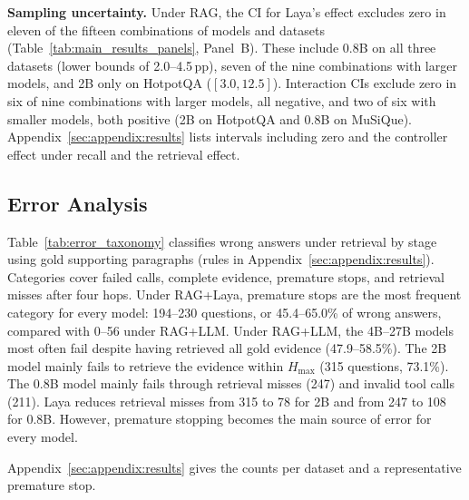 \textbf{Sampling uncertainty.} Under RAG, the CI for Laya's effect excludes zero in
eleven of the fifteen combinations of models and datasets
(Table~\ref{tab:main_results_panels}, Panel~B). These include 0.8B on all three
datasets (lower bounds of 2.0--4.5\,pp), seven of the nine combinations with larger
models, and 2B only on HotpotQA ($[3.0, 12.5]$). Interaction CIs exclude zero in six
of nine combinations with larger models, all negative, and two of six with smaller
models, both positive (2B on HotpotQA and 0.8B on MuSiQue).
Appendix~\ref{sec:appendix:results} lists intervals including zero and the controller
effect under recall and the retrieval effect.

\subsection{Error Analysis}
\label{sec:exp:errors}

Table~\ref{tab:error_taxonomy} classifies wrong answers under retrieval by stage using
gold supporting paragraphs (rules in Appendix~\ref{sec:appendix:results}). Categories
cover failed calls, complete evidence, premature stops, and retrieval misses after four
hops. Under RAG+Laya, premature stops are the most frequent
category for every model: 194--230 questions, or 45.4--65.0\% of wrong answers, compared
with 0--56 under RAG+LLM. Under RAG+LLM, the 4B--27B models most often fail despite
having retrieved all gold evidence (47.9--58.5\%). The 2B model mainly fails to retrieve
the evidence within $H_{\max}$ (315 questions, 73.1\%). The 0.8B model mainly fails
through retrieval misses (247) and invalid tool calls (211). Laya reduces retrieval
misses from 315 to 78 for 2B and from 247 to 108 for 0.8B. However, premature stopping
becomes the main source of error for every model.

Appendix~\ref{sec:appendix:results} gives the counts per dataset and a representative
premature stop.


